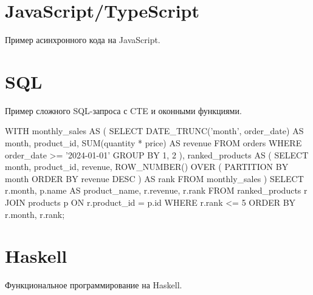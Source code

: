 \section{JavaScript/TypeScript}

Пример асинхронного кода на JavaScript.


\section{SQL}

Пример сложного SQL-запроса с CTE и оконными функциями.

\begin{sql}
WITH monthly_sales AS (
    SELECT
        DATE_TRUNC('month', order_date) AS month,
        product_id,
        SUM(quantity * price) AS revenue
    FROM orders
    WHERE order_date >= '2024-01-01'
    GROUP BY 1, 2
),
ranked_products AS (
    SELECT
        month,
        product_id,
        revenue,
        ROW_NUMBER() OVER (
            PARTITION BY month
            ORDER BY revenue DESC
        ) AS rank
    FROM monthly_sales
)
SELECT
    r.month,
    p.name AS product_name,
    r.revenue,
    r.rank
FROM ranked_products r
JOIN products p ON r.product_id = p.id
WHERE r.rank <= 5
ORDER BY r.month, r.rank;
\end{sql}

\section{Haskell}

Функциональное программирование на Haskell.

